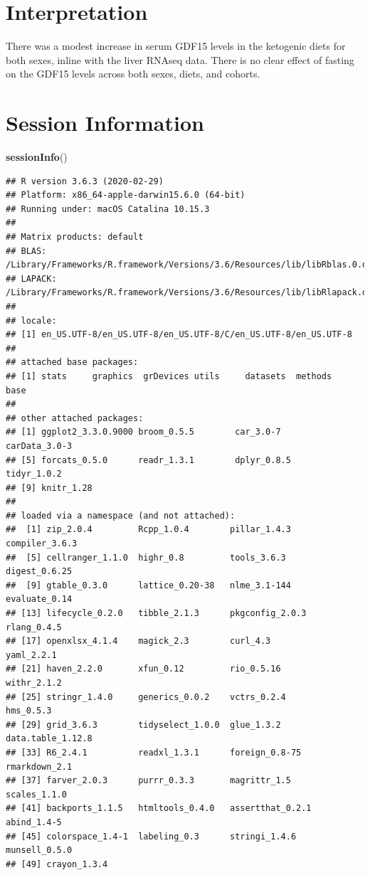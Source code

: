 \documentclass[]{article}
\newenvironment{Shaded}{\begin{snugshade}}{\end{snugshade}}
\newcommand{\KeywordTok}[1]{\textcolor[rgb]{0.13,0.29,0.53}{\textbf{#1}}}
\newcommand{\NormalTok}[1]{#1}
\begin{document}
\hypertarget{interpretation}{%
\section{Interpretation}\label{interpretation}}

There was a modest increase in serum GDF15 levels in the ketogenic diets
for both sexes, inline with the liver RNAseq data. There is no clear
effect of fasting on the GDF15 levels across both sexes, diets, and
cohorts.

\hypertarget{session-information}{%
\section{Session Information}\label{session-information}}

\begin{Shaded}
\begin{Highlighting}[]
\KeywordTok{sessionInfo}\NormalTok{()}
\end{Highlighting}
\end{Shaded}

\begin{verbatim}
## R version 3.6.3 (2020-02-29)
## Platform: x86_64-apple-darwin15.6.0 (64-bit)
## Running under: macOS Catalina 10.15.3
## 
## Matrix products: default
## BLAS:   /Library/Frameworks/R.framework/Versions/3.6/Resources/lib/libRblas.0.dylib
## LAPACK: /Library/Frameworks/R.framework/Versions/3.6/Resources/lib/libRlapack.dylib
## 
## locale:
## [1] en_US.UTF-8/en_US.UTF-8/en_US.UTF-8/C/en_US.UTF-8/en_US.UTF-8
## 
## attached base packages:
## [1] stats     graphics  grDevices utils     datasets  methods   base     
## 
## other attached packages:
## [1] ggplot2_3.3.0.9000 broom_0.5.5        car_3.0-7          carData_3.0-3     
## [5] forcats_0.5.0      readr_1.3.1        dplyr_0.8.5        tidyr_1.0.2       
## [9] knitr_1.28        
## 
## loaded via a namespace (and not attached):
##  [1] zip_2.0.4         Rcpp_1.0.4        pillar_1.4.3      compiler_3.6.3   
##  [5] cellranger_1.1.0  highr_0.8         tools_3.6.3       digest_0.6.25    
##  [9] gtable_0.3.0      lattice_0.20-38   nlme_3.1-144      evaluate_0.14    
## [13] lifecycle_0.2.0   tibble_2.1.3      pkgconfig_2.0.3   rlang_0.4.5      
## [17] openxlsx_4.1.4    magick_2.3        curl_4.3          yaml_2.2.1       
## [21] haven_2.2.0       xfun_0.12         rio_0.5.16        withr_2.1.2      
## [25] stringr_1.4.0     generics_0.0.2    vctrs_0.2.4       hms_0.5.3        
## [29] grid_3.6.3        tidyselect_1.0.0  glue_1.3.2        data.table_1.12.8
## [33] R6_2.4.1          readxl_1.3.1      foreign_0.8-75    rmarkdown_2.1    
## [37] farver_2.0.3      purrr_0.3.3       magrittr_1.5      scales_1.1.0     
## [41] backports_1.1.5   htmltools_0.4.0   assertthat_0.2.1  abind_1.4-5      
## [45] colorspace_1.4-1  labeling_0.3      stringi_1.4.6     munsell_0.5.0    
## [49] crayon_1.3.4
\end{verbatim}
\end{document}
